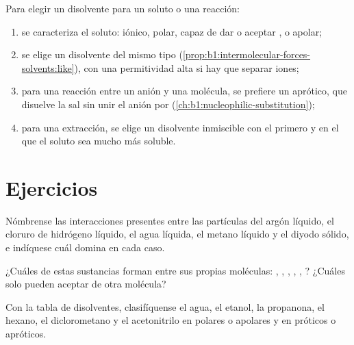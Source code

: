 \begin{method}\label{met:b1:intermolecular-forces-solvents:choose}
Para elegir un disolvente para un soluto o una reacción:
\begin{enumerate}
  \item se caracteriza el soluto: iónico, polar, capaz de dar o aceptar
        , o apolar;
  \item se elige un disolvente del mismo tipo (\cref{prop:b1:intermolecular-forces-solvents:like}),
        con una permitividad alta si hay que separar iones;
  \item para una reacción entre un anión y una molécula, se prefiere un
         aprótico, que disuelve la sal sin unir el anión
        por  (\cref{ch:b1:nucleophilic-substitution});
  \item para una extracción, se elige un disolvente inmiscible con el
        primero y en el que el soluto sea mucho más soluble.
\end{enumerate}
\end{method}

\section{Ejercicios}

\begin{exercise}[$\star$]\label{exo:b1:intermolecular-forces-solvents:1}
Nómbrense las interacciones presentes entre las partículas del argón
líquido, el cloruro de hidrógeno líquido, el agua líquida, el metano
líquido y el diyodo sólido, e indíquese cuál domina en cada caso.
\end{exercise}

\begin{exercise}[$\star$]\label{exo:b1:intermolecular-forces-solvents:2}
¿Cuáles de estas sustancias forman  entre sus propias
moléculas: , , , , ,
? ¿Cuáles solo pueden aceptar  de otra
molécula?
\end{exercise}

\begin{exercise}[$\star$]\label{exo:b1:intermolecular-forces-solvents:3}
Con la tabla de disolventes, clasifíquense el agua, el etanol, la
propanona, el hexano, el diclorometano y el acetonitrilo en polares o
apolares y en próticos o apróticos.
\end{exercise}

